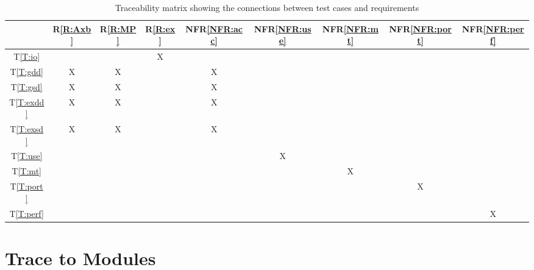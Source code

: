 \documentclass[12pt, titlepage]{article}
\newcommand{\rref}[1]{R\ref{#1}}
\newcommand{\nfrref}[1]{NFR\ref{#1}}
\newcommand{\tref}[1]{T\ref{#1}}
\begin{document}
\begin{table}[H]
  \centering
  \begin{tabular}{|c|c|c|c|c|c|c|c|c|}                                      \hline
                  & \rref{R:Axb} & \rref{R:MP} & \rref{R:ex} & \nfrref{NFR:acc} & \nfrref{NFR:use} & \nfrref{NFR:mt} & \nfrref{NFR:port} & \nfrref{NFR:perf} \\ \hline
    \tref{T:io}   &              &             & X           &                  &                  &                 &                   &                   \\ \hline
    \tref{T:gdd}  & X            & X           &             & X                &                  &                 &                   &                   \\ \hline
    \tref{T:gsd}  & X            & X           &             & X                &                  &                 &                   &                   \\ \hline
    \tref{T:exdd} & X            & X           &             & X                &                  &                 &                   &                   \\ \hline
    \tref{T:exsd} & X            & X           &             & X                &                  &                 &                   &                   \\ \hline
    \tref{T:use}  &              &             &             &                  & X                &                 &                   &                   \\ \hline
    \tref{T:mt}   &              &             &             &                  &                  & X               &                   &                   \\ \hline
    \tref{T:port} &              &             &             &                  &                  &                 & X                 &                   \\ \hline
    \tref{T:perf} &              &             &             &                  &                  &                 &                   & X                 \\ \hline
  \end{tabular}
  \caption{Traceability matrix showing the connections between test cases and
    requirements}
  \label{Table:T_trace}
\end{table}

\section{Trace to Modules}
\end{document}
